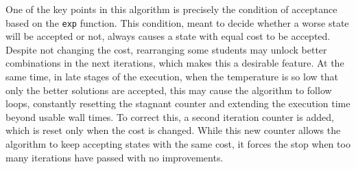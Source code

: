 One of the key points in this algorithm is precisely the condition of acceptance based on the \texttt{exp} function. This condition, meant to decide whether a worse state will be accepted or not, always causes a state with equal cost to be accepted. Despite not changing the cost, rearranging some students may unlock better combinations in the next iterations, which makes this a desirable feature. At the same time, in late stages of the execution, when the temperature is so low that only the better solutions are accepted, this may cause the algorithm to follow loops, constantly resetting the stagnant counter and extending the execution time beyond usable wall times. To correct this, a second iteration counter is added, which is reset only when the cost is changed. While this new counter allows the algorithm to keep accepting states with the same cost, it forces the stop when too many iterations have passed with no improvements.


